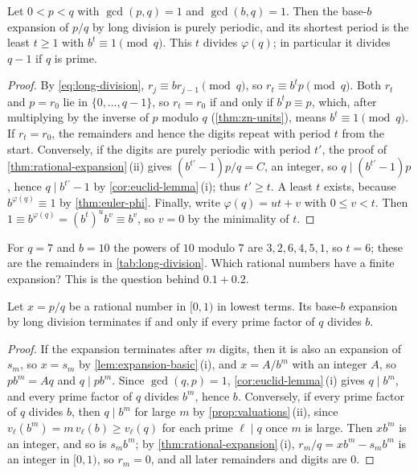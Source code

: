 \begin{proposition}
\label{prop:period}
Let $0<p<q$ with $\gcd(p,q)=1$ and $\gcd(b,q)=1$. Then the base-$b$ expansion of $p/q$ by long division is purely periodic, and its shortest period is the least $t\ge1$ with $b^t\equiv1\pmod q$. This $t$ divides $\varphi(q)$; in particular it divides $q-1$ if $q$ is prime.
\end{proposition}

\begin{proof}
By \eqref{eq:long-division}, $r_j\equiv br_{j-1}\pmod q$, so $r_t\equiv b^tp\pmod q$. Both $r_t$ and $p=r_0$ lie in $\{0,\ldots,q-1\}$, so $r_t=r_0$ if and only if $b^tp\equiv p$, which, after multiplying by the inverse of $p$ modulo $q$ (\cref{thm:zn-units}), means $b^t\equiv1\pmod q$. If $r_t=r_0$, the remainders and hence the digits repeat with period $t$ from the start. Conversely, if the digits are purely periodic with period $t'$, the proof of \cref{thm:rational-expansion}\,(ii) gives $(b^{t'}-1)p/q=C$, an integer, so $q\mid(b^{t'}-1)p$, hence $q\mid b^{t'}-1$ by \cref{cor:euclid-lemma}\,(i); thus $t'\ge t$. A least $t$ exists, because $b^{\varphi(q)}\equiv1$ by \cref{thm:euler-phi}. Finally, write $\varphi(q)=ut+v$ with $0\le v<t$. Then $1\equiv b^{\varphi(q)}=(b^t)^ub^v\equiv b^v$, so $v=0$ by the minimality of $t$.
\end{proof}

For $q=7$ and $b=10$ the powers of $10$ modulo $7$ are $3,2,6,4,5,1$, so $t=6$; these are the remainders in \cref{tab:long-division}. Which rational numbers have a finite expansion? This is the question behind $0.1+0.2$.

\begin{proposition}
\label{prop:terminating}
Let $x=p/q$ be a rational number in $[0,1)$ in lowest terms. Its base-$b$ expansion by long division terminates if and only if every prime factor of $q$ divides $b$.
\end{proposition}

\begin{proof}
If the expansion terminates after $m$ digits, then it is also an expansion of $s_m$, so $x=s_m$ by \cref{lem:expansion-basic}\,(i), and $x=A/b^m$ with an integer $A$, so $pb^m=Aq$ and $q\mid pb^m$. Since $\gcd(q,p)=1$, \cref{cor:euclid-lemma}\,(i) gives $q\mid b^m$, and every prime factor of $q$ divides $b^m$, hence $b$. Conversely, if every prime factor of $q$ divides $b$, then $q\mid b^m$ for large $m$ by \cref{prop:valuations}\,(ii), since $v_\ell(b^m)=m\,v_\ell(b)\ge v_\ell(q)$ for each prime $\ell\mid q$ once $m$ is large. Then $xb^m$ is an integer, and so is $s_mb^m$; by \cref{thm:rational-expansion}\,(i), $r_m/q=xb^m-s_mb^m$ is an integer in $[0,1)$, so $r_m=0$, and all later remainders and digits are $0$.
\end{proof}

